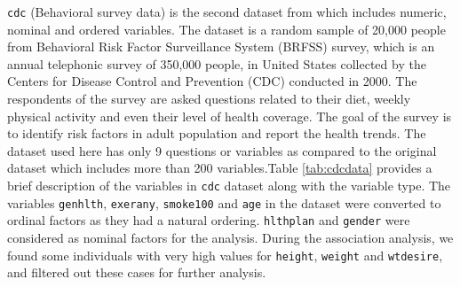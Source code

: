 \begin{Schunk}
\begin{table}

\caption{\label{tab:germanelection}Variable description of a subset of the German election result dataset from 2002 and 2005.}
\centering
{}
\end{table}

\end{Schunk}

\texttt{cdc} (Behavioral survey data) is the second dataset from
\citet{cdc} which includes numeric, nominal and ordered variables. The
dataset is a random sample of 20,000 people from Behavioral Risk Factor
Surveillance System (BRFSS) survey, which is an annual telephonic survey
of 350,000 people, in United States collected by the Centers for Disease
Control and Prevention (CDC) conducted in 2000. The respondents of the
survey are asked questions related to their diet, weekly physical
activity and even their level of health coverage. The goal of the survey
is to identify risk factors in adult population and report the health
trends. The dataset used here has only 9 questions or variables as
compared to the original dataset which includes more than 200
variables.Table \ref{tab:cdcdata} provides a brief description of the
variables in \texttt{cdc} dataset along with the variable type. The
variables \texttt{genhlth}, \texttt{exerany}, \texttt{smoke100} and
\texttt{age} in the dataset were converted to ordinal factors as they
had a natural ordering. \texttt{hlthplan} and \texttt{gender} were
considered as nominal factors for the analysis. During the association
analysis, we found some individuals with very high values for
\texttt{height}, \texttt{weight} and \texttt{wtdesire}, and filtered out
these cases for further analysis.

